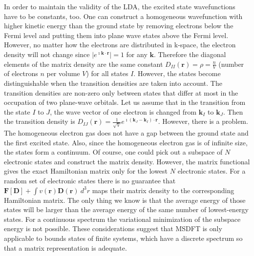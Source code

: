 \documentclass[journal=jpca,manuscript=article,layout=singlecolumn]{achemso}
\newcommand\m[1]{\mathbf{#1}}
\renewcommand\vec[1]{\mathbf{#1}}
\begin{document}
In order to maintain the validity of the LDA, the excited state wavefunctions have to be constants, too.
One can construct a homogeneous wavefunction with higher kinetic energy than the ground state by removing electrons
below the Fermi level and putting them into plane wave states above the Fermi level. \cite{Hemanadhan2010}
However, no matter how the electrons are distributed in k-space, the electron density will not change
since $\vert e^{\imath \vec{k} \cdot \vec{r}} \vert = 1$ for any $\vec{\vec{k}}$.
Therefore the diagonal elements of the matrix density are the same constant $D_{II}(\vec{r}) = \rho = \frac{n}{V}$
(number of electrons $n$ per volume $V$) for all states $I$.
However, the states become distinguishable when the transition densities are taken into account.
The transition densities are non-zero only between states that differ at most in the occupation of two plane-wave orbitals.
Let us assume that in the transition from the state $I$ to $J$, the wave vector of one electron is changed from
$\vec{k}_I$ to $\vec{k}_J$. Then the transition density is
$D_{IJ}(\vec{r}) = \frac{1}{\sqrt{V}} e^{\imath (\vec{k}_J - \vec{k}_I) \cdot \vec{r}}$.
However, there is a problem. The homogeneous electron gas does not have a gap between the ground state and the first excited state.
Also, since the homogeneous electron gas is of infinite size, the states form a continuum. Of course, one could pick out a subspace of $N$
electronic states and construct the matrix density. 
However, the matrix functional gives the exact Hamiltonian matrix only for the lowest $N$ electronic states.
For a random set of electronic states there is no guarantee that $\m{F}[\m{D}] + \int v(\vec{r}) \m{D}(\vec{r}) ~ d^3\!r$
maps their matrix density to the corresponding Hamiltonian matrix.
The only thing we know is that the average energy of those states will be larger than the average energy
of the same number of lowest-energy states. For a continuous spectrum the variational minimization of the subspace energy is not possible.
These considerations suggest that MSDFT is only applicable to bounds states of finite systems, which have a discrete spectrum
so that a matrix representation is adequate.
\end{document}
